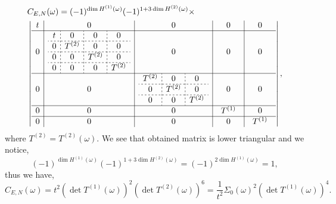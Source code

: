 \documentclass{article}
\begin{document}
\begin{equation}
\begin{split}
    &C_{E,N}(\omega) = (-1)^{\dim H^{(1)}(\omega)} (-1)^{1 + 3\dim H^{(2)}(\omega)} \times\\ 
    &\left\vert
    \begin{array}{c|c|c|c|c}
        t & 0 & 0 & 0 & 0 \\
        \hline
        0 & 
        \begin{array}{c;{2pt/2pt}c;{2pt/2pt}c;{2pt/2pt}c}
            t & 0 & 0 & 0 \\
            \hdashline[2pt/2pt]
            0 & T^{(2)} & 0 & 0 \\
            \hdashline[2pt/2pt]
            0 & 0 & T^{(2)} & 0 \\
            \hdashline[2pt/2pt]
            0 & 0 & 0 & T^{(2)} \\
        \end{array}        
        & 0 & 0 & 0 \\
        \hline
        0 & 
            0 & 
            \begin{array}{c;{2pt/2pt}c;{2pt/2pt}c}
                T^{(2)} & 0 & 0 \\
                \hdashline[2pt/2pt]
                0 & T^{(2)} & 0  \\
                \hdashline[2pt/2pt]
                0 & 0 & T^{(2)}
            \end{array}            
            & 0 & 0 \\
        \hline
        0 & 
            0 & 0 &\begin{array}{c} T^{(1)} \end{array} & 0 \\
        \hline
        0 & 
            0 & 0 & 0 & \begin{array}{c} T^{(1)} \end{array}
    \end{array}
    \right\vert,
\end{split}
\end{equation}
where $T^{(2)} = T^{(2)}(\omega)$. We see that obtained matrix is lower triangular and we notice,
\begin{equation}
    (-1)^{\dim H^{(1)}(\omega)} (-1)^{1 + 3\dim H^{(2)}(\omega)} =
    (-1)^{2\dim H^{(1)}(\omega)} = 1,
\end{equation}
thus we have,
\begin{equation}
    C_{E,N}(\omega) = t^2 
        \left(\det T^{(1)}(\omega) \right)^2 
        \left(\det T^{(2)}(\omega) \right)^6 
    =   \frac{1}{t^2} 
        \Sigma_0(\omega)^2 
        \left(\det T^{(1)}(\omega) \right)^4.
\end{equation}
\end{document}

